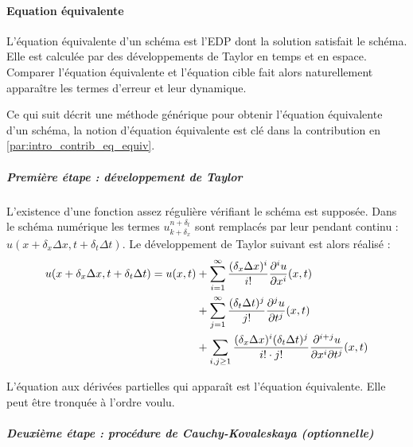         \paragraph{Equation équivalente}\label{par:eq_equiv}
        \begin{definition}
        L'équation équivalente d'un schéma est l'EDP dont la solution satisfait le schéma.
        Elle est calculée par des développements de Taylor en temps et en espace.
        Comparer l'équation équivalente et l'équation cible fait alors naturellement apparaître les termes d'erreur et leur dynamique.
        \end{definition}

        Ce qui suit décrit une méthode générique pour obtenir l'équation équivalente d'un schéma, la notion d'équation équivalente est clé dans la contribution en \ref{par:intro_contrib_eq_equiv}.

        \subparagraph{Première étape : développement de Taylor}

        L'existence d'une fonction assez régulière vérifiant le schéma est supposée.
        Dans le schéma numérique les termes $u^{n+\delta_t}_{k+\delta_x}$ sont remplacés par leur pendant
        continu : $u(x+\delta_x \Delta x, t + \delta_t \Delta t)$. Le développement de Taylor suivant est alors réalisé :
        \begin{align}
        u(x+\delta_x \Delta x, t + \delta_t \Delta t) = u(x,t)
        &+ \sum_{i=1}^{\infty} \frac{(\delta_x \Delta x)^i}{i!}
        \frac{\partial^i u}{\partial x^i}(x,t) \notag \\
        &+ \sum_{j=1}^{\infty} \frac{(\delta_t \Delta t)^j}{j!}
        \frac{\partial^j u}{\partial t^j}(x,t) \notag \\
        &+ \sum_{i,j \geq 1} \frac{(\delta_x \Delta x)^i (\delta_t \Delta t)^j}{i! \cdot j!}
        \frac{\partial^{i+j} u}{\partial x^i \partial t^j}(x,t)
        \end{align}

        L'équation aux dérivées partielles qui apparaît est l'équation équivalente. Elle peut être tronquée à l'ordre voulu.

        \subparagraph{Deuxième étape : procédure de Cauchy-Kovaleskaya (optionnelle)}

